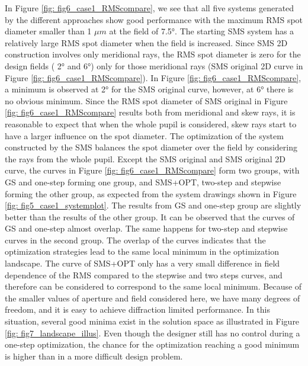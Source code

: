 In Figure \ref{fig: fig6_case1_RMScompare}, we see that all five systems generated by the different approaches show good performance with the maximum RMS spot diameter smaller than 1 $\mu m$ at the field of 7.5°. The starting SMS system has a relatively large RMS spot diameter when the field is increased. Since SMS 2D construction involves only meridional rays, the RMS spot diameter is zero for the design fields ( 2° and 6°) only for those meridional rays (SMS original 2D curve in Figure \ref{fig: fig6_case1_RMScompare}). In Figure \ref{fig: fig6_case1_RMScompare}, a minimum is observed at 2° for the SMS original curve, however, at 6° there is no obvious minimum. Since the RMS spot diameter of SMS original in Figure \ref{fig: fig6_case1_RMScompare} results both from meridional and skew rays, it is reasonable to expect that when the whole pupil is considered, skew rays start to have a larger influence on the spot diameter. The optimization of the system constructed by the SMS balances the spot diameter over the field by considering the rays from the whole pupil. Except the SMS original and SMS original 2D curve, the curves in Figure \ref{fig: fig6_case1_RMScompare} form two groups, with GS and one-step forming one group, and SMS+OPT, two-step and stepwise forming the other group, as expected from the system drawings shown in Figure \ref{fig: fig5_case1_systemplot}. The results from GS and one-step group are slightly better than the results of the other group.  It can be observed that the curves of GS and one-step almost overlap. The same happens for two-step and stepwise curves in the second group. The overlap of the curves indicates that the optimization strategies lead to the same local minimum in the optimization landscape. The curve of SMS+OPT only has a very small difference in field dependence of the RMS compared to the stepwise and two steps curves, and therefore can be considered to correspond to the same local minimum. Because of the smaller values of aperture and field considered here, we have many degrees of freedom, and it is easy to achieve diffraction limited performance. In this situation, several good minima exist in the solution space as illustrated in Figure \ref{fig: fig7_landscape_illus}. Even though the designer still has no control during a one-step optimization, the chance for the optimization reaching a good minimum is higher than in a more difficult design problem.


